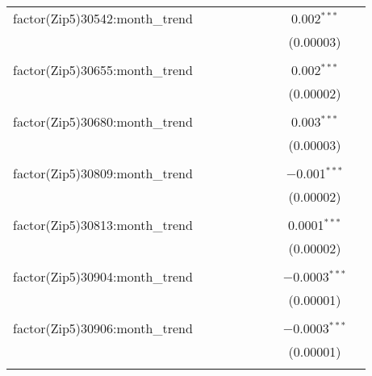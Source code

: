 \begin{table}[H]
{\begin{tabular}{@{\extracolsep{5pt}}lcccccccc}
  factor(Zip5)30542:month\_trend &  &  &  &  &  &  & 0.002$^{***}$ &  \\  

   &  &  &  &  &  &  & (0.00003) &  \\  

   & & & & & & & & \\  

  factor(Zip5)30655:month\_trend &  &  &  &  &  &  & 0.002$^{***}$ &  \\  

   &  &  &  &  &  &  & (0.00002) &  \\  

   & & & & & & & & \\  

  factor(Zip5)30680:month\_trend &  &  &  &  &  &  & 0.003$^{***}$ &  \\  

   &  &  &  &  &  &  & (0.00003) &  \\  

   & & & & & & & & \\  

  factor(Zip5)30809:month\_trend &  &  &  &  &  &  & $-$0.001$^{***}$ &  \\  

   &  &  &  &  &  &  & (0.00002) &  \\  

   & & & & & & & & \\  

  factor(Zip5)30813:month\_trend &  &  &  &  &  &  & 0.0001$^{***}$ &  \\  

   &  &  &  &  &  &  & (0.00002) &  \\  

   & & & & & & & & \\  

  factor(Zip5)30904:month\_trend &  &  &  &  &  &  & $-$0.0003$^{***}$ &  \\  

   &  &  &  &  &  &  & (0.00001) &  \\  

   & & & & & & & & \\  

  factor(Zip5)30906:month\_trend &  &  &  &  &  &  & $-$0.0003$^{***}$ &  \\  

   &  &  &  &  &  &  & (0.00001) &  \\  

   & & & & & & & & \\  


\end{tabular}}
\end{table}
